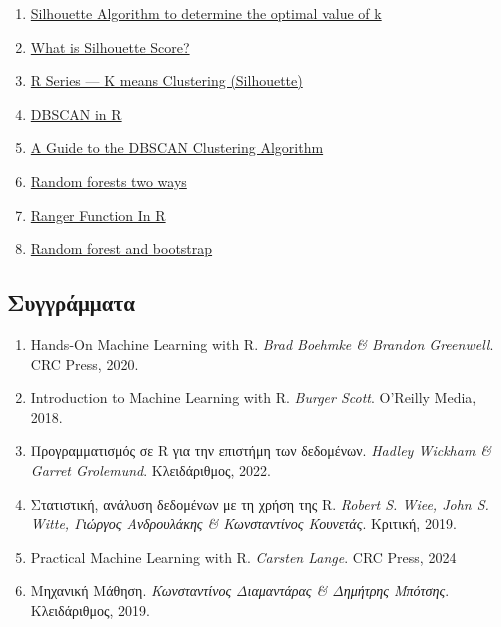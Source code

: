 \documentclass[
]{article}
\begin{document}
\begin{enumerate}
{  Elbow Method in R to Find Optimal Clusters}
\item
  \href{https://www.geeksforgeeks.org/machine-learning/silhouette-algorithm-to-determine-the-optimal-value-of-k/}{Silhouette
  Algorithm to determine the optimal value of k}
\item
  \href{https://medium.com/@hazallgultekin/what-is-silhouette-score-f428fb39bf9a}{What
  is Silhouette Score?}
\item
  \href{https://medium.com/codesmart/r-series-k-means-clustering-silhouette-794774b46586}{R
  Series --- K means Clustering (Silhouette)}
\item
  \href{https://medium.com/@amit25173/dbscan-in-r-3c93c97b674b}{DBSCAN
  in R}
\item
  \href{https://www.datacamp.com/tutorial/dbscan-clustering-algorithm}{A
  Guide to the DBSCAN Clustering Algorithm}
\item
  \href{https://www.css.cornell.edu/faculty/dgr2/_static/files/R_html/CompareRandomForestPackages.html}{Random
  forests two ways}
\item
  \href{https://www.geeksforgeeks.org/r-language/ranger-function-in-r/}{Ranger
  Function In R}
\item
  \href{https://medium.com/@miameyer15/random-forest-and-bootstrap-bbfa1f9927c5}{Random
  forest and bootstrap}
\end{enumerate}

\subsection{Συγγράμματα}\label{ux3c3ux3c5ux3b3ux3b3ux3c1ux3acux3bcux3bcux3b1ux3c4ux3b1}

\begin{enumerate}
\def\labelenumi{\arabic{enumi}.}
\item
  Hands-On Machine Learning with R. \emph{Brad Boehmke \& Brandon
  Greenwell}. CRC Press, 2020.
\item
  Introduction to Machine Learning with R. \emph{Burger Scott}. O'Reilly
  Media, 2018.
\item
  Προγραμματισμός σε R για την επιστήμη των δεδομένων. \emph{Hadley
  Wickham \& Garret Grolemund}. Κλειδάριθμος, 2022.
\item
  Στατιστική, ανάλυση δεδομένων με τη χρήση της R. \emph{Robert S. Wiee,
  John S. Witte, Γιώργος Ανδρουλάκης \& Κωνσταντίνος Κουνετάς}. Κριτική,
  2019.
\item
  Practical Machine Learning with R. \emph{Carsten Lange}. CRC Press,
  2024
\item
  Μηχανική Μάθηση. \emph{Κωνσταντίνος Διαμαντάρας \& Δημήτρης Μπότσης}.
  Κλειδάριθμος, 2019.
\end{enumerate}
\end{document}
